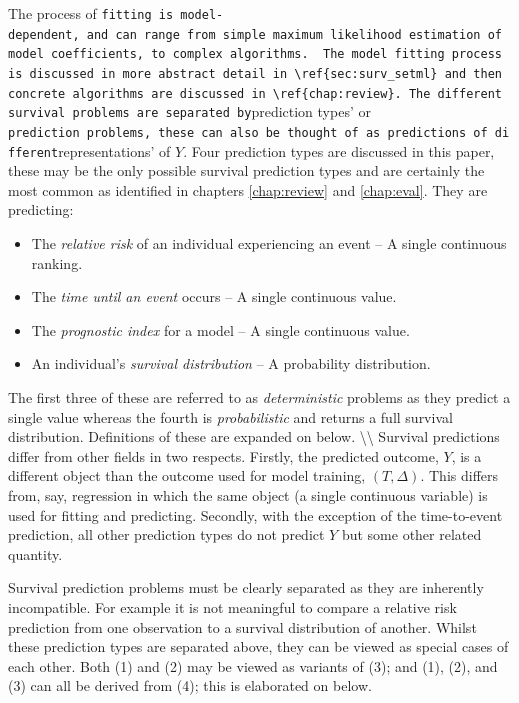 \documentclass[
  letterpaper,
]{scrbook}
\providecommand{\tightlist}{%
  \setlength{\itemsep}{0pt}\setlength{\parskip}{0pt}}\usepackage{longtable,booktabs,array}
\theoremstyle{plain}
\theoremstyle{definition}
\theoremstyle{remark}
\begin{document}
The process of
\texttt{fitting\textquotesingle{}\ is\ model-dependent,\ and\ can\ range\ from\ simple\ maximum\ likelihood\ estimation\ of\ model\ coefficients,\ to\ complex\ algorithms.\ \ The\ model\ fitting\ process\ is\ discussed\ in\ more\ abstract\ detail\ in\ \textbackslash{}ref\{sec:surv\_setml\}\ and\ then\ concrete\ algorithms\ are\ discussed\ in\ \textbackslash{}ref\{chap:review\}.\ The\ different\ survival\ problems\ are\ separated\ by}prediction
types' or
\texttt{prediction\ problems\textquotesingle{},\ these\ can\ also\ be\ thought\ of\ as\ predictions\ of\ different}representations'
of \(Y\). Four prediction types are discussed in this paper, these may
be the only possible survival prediction types and are certainly the
most common as identified in chapters \ref{chap:review} and
\ref{chap:eval}. They are predicting:

\begin{itemize}
\tightlist
\item
  The \emph{relative risk} of an individual experiencing an event -- A
  single continuous ranking.
\item
  The \emph{time until an event} occurs -- A single continuous value.
\item
  The \emph{prognostic index} for a model -- A single continuous value.
\item
  An individual's \emph{survival distribution} -- A probability
  distribution.
\end{itemize}

The first three of these are referred to as \emph{deterministic}
problems as they predict a single value whereas the fourth is
\emph{probabilistic} and returns a full survival distribution.
Definitions of these are expanded on below.
\textbackslash\textbackslash{} Survival predictions differ from other
fields in two respects. Firstly, the predicted outcome, \(Y\), is a
different object than the outcome used for model training,
\((T, \Delta)\). This differs from, say, regression in which the same
object (a single continuous variable) is used for fitting and
predicting. Secondly, with the exception of the time-to-event
prediction, all other prediction types do not predict \(Y\) but some
other related quantity.

Survival prediction problems must be clearly separated as they are
inherently incompatible. For example it is not meaningful to compare a
relative risk prediction from one observation to a survival distribution
of another. Whilst these prediction types are separated above, they can
be viewed as special cases of each other. Both (1) and (2) may be viewed
as variants of (3); and (1), (2), and (3) can all be derived from (4);
this is elaborated on below.
\end{document}
